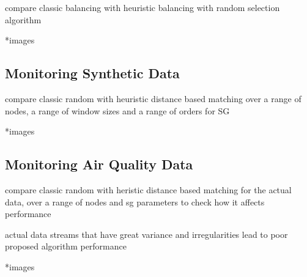 compare classic balancing with heuristic balancing with random selection algorithm

*images

\subsection{Monitoring Synthetic Data}

compare classic random with heuristic distance based matching over a range of nodes, a range of window sizes and a range of orders for SG

*images

\subsection{Monitoring Air Quality Data}

compare classic random with heristic distance based matching for the actual data, over a range of nodes and sg parameters to check how it affects performance

actual data streams that have great variance and irregularities lead to poor proposed algorithm performance

*images

